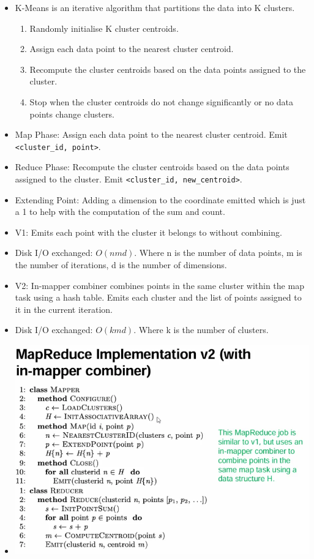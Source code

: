 \documentclass[10pt, landscape]{article}
\begin{document}
\begin{multicols*}{4}
  \begin{itemize}
    \item K-Means is an iterative algorithm that partitions the data into K clusters.
         \begin{enumerate}
          \item Randomly initialise K cluster centroids.
          \item Assign each data point to the nearest cluster centroid.
          \item Recompute the cluster centroids based on the data points assigned to the cluster.
          \item Stop when the cluster centroids do not change significantly or no data points change clusters.
         \end{enumerate}
     \item Map Phase: Assign each data point to the nearest cluster centroid. Emit \texttt{<cluster\_id, point>}.
     \item Reduce Phase: Recompute the cluster centroids based on the data points assigned to the cluster. Emit \texttt{<cluster\_id, new\_centroid>}.
     \item Extending Point: Adding a dimension to the coordinate emitted which is just a 1 to help with the computation of the sum and count.
     \item V1: Emits each point with the cluster it belongs to without combining.
     \item Disk I/O exchanged: $O(nmd)$. Where n is the number of data points, m is the number of iterations, d is the number of dimensions.
     \item V2: In-mapper combiner combines points in the same cluster within the map task using a hash table. Emits each cluster and the list of points assigned to it in the current iteration.
     \item Disk I/O exchanged: $O(kmd)$. Where k is the number of clusters.
     \item \includegraphics[width=0.95\linewidth]{kmeans_mapreduce.png}
  \end{itemize}


\end{multicols*}
\end{document}
